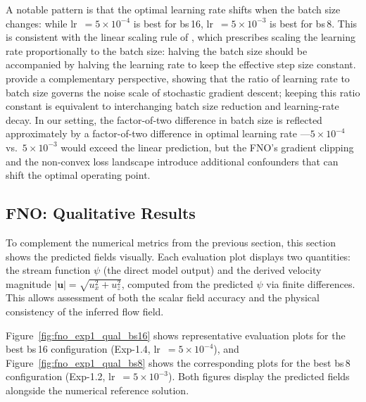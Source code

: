 A notable pattern is that the optimal learning rate shifts when the batch size changes: while lr~$= 5\times10^{-4}$ is best for bs\,16, lr~$= 5\times10^{-3}$ is best for bs\,8. This is consistent with the linear scaling rule of \textcite{goyal2018accuratelargeminibatchsgd}, which prescribes scaling the learning rate proportionally to the batch size: halving the batch size should be accompanied by halving the learning rate to keep the effective step size constant. \textcite{smith2018dontdecaylearningrate} provide a complementary perspective, showing that the ratio of learning rate to batch size governs the noise scale of stochastic gradient descent; keeping this ratio constant is equivalent to interchanging batch size reduction and learning-rate decay. In our setting, the factor-of-two difference in batch size is reflected approximately by a factor-of-two difference in optimal learning rate ---$5\times10^{-4}$ vs.\ $5\times10^{-3}$ would exceed the linear prediction, but the FNO's gradient clipping and the non-convex loss landscape introduce additional confounders that can shift the optimal operating point.

\subsection{FNO: Qualitative Results}
\label{ssec:results:exp1:fno:qualitative}

To complement the numerical metrics from the previous section, this section shows the predicted fields visually. Each evaluation plot displays two quantities: the stream function $\psi$ (the direct model output) and the derived velocity magnitude $|\mathbf{u}| = \sqrt{u_x^2 + u_z^2}$, computed from the predicted $\psi$ via finite differences. This allows assessment of both the scalar field accuracy and the physical consistency of the inferred flow field.

Figure~\ref{fig:fno_exp1_qual_bs16} shows representative evaluation plots for the best bs\,16 configuration (Exp-1.4, lr~$=5\times10^{-4}$), and Figure~\ref{fig:fno_exp1_qual_bs8} shows the corresponding plots for the best bs\,8 configuration (Exp-1.2, lr~$=5\times10^{-3}$). Both figures display the predicted fields alongside the numerical reference solution.

